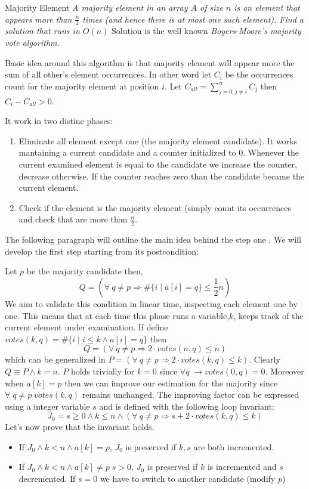 \begin{problem}{Majority Element}
\textit{A majority element in an array $A$ of size $n$ is an element that appears more than $\frac{n}{2}$ times (and hence there is at most one such element). Find a solution that runs in $O(n)$}
Solution is the well known \textit{Boyers-Moore's majority vote algorithm}.
\begin{solution}
Basic idea around this algorithm is that majority element will appear more the sum of all other's element occurrences. In other word let $C_i$ be the  occurrences count 
for the majority element at position $i$. Let $C_{all} = \sum_{j=0,j\neq i}^n C_j$ then $ C_i - C_{all} > 0$.

It work in two distinc phases:
\begin{enumerate}
\item Eliminate all element except one (the majority element candidate). It works mantaining a current candidate and a counter initialized to $0$. Whenever the current examined element is equal to the candidate we increase the counter, decrease otherwise. If the counter reaches zero than the candidate became the current element. 
\item Check if the element is the majority element (simply count its occurrences and check that are more than $\frac{n}{2}$.

\end{enumerate}

The following paragraph will outline the main idea behind the step one \cite{pap:hesselink}.
We will develop the first step starting from its postcondition:

Let $p$ be the majority candidate then,
\[
Q = (\forall \: q \neq p \Rightarrow \#\{i \; | \; a[i] = q \}\leq \frac{1}{2}n)
\]
We aim to validate this condition in linear time, inspecting each element one by one. This means that at each time this phase runs a variable,$k$, keeps track of the current  element under examination. 
If define $ votes(k,q) = \#\{i \; | \; i \leq k  \wedge a[i] = q \} $ then 
\[
Q = (\forall \: q \neq p \Rightarrow 2\cdot votes(n,q) \leq n)
\]
which can be generalized in $P = (\forall \: q \neq p \Rightarrow 2\cdot votes(k,q) \leq k)$. Clearly $Q \equiv P \wedge k=n$.
$P$ holds trivially for $k=0$ since $\forall q \; \rightarrow votes(0,q)=0$. Moreover when $ a[k] =p $ then we can improve our estimation for the majority since $\forall \; q\neq p \; votes(k,q)$ remains unchanged.
The improving factor  can be expressed using a integer variable $s$ and is defined with the following loop invariant:
\[
J_0 = s \geq 0 \wedge k\leq n \wedge (\forall \: q \neq p \Rightarrow s+2\cdot votes(k,q) \leq k)
\]
Let's now prove that the invariant holds.
\begin{itemize}
	\item If $J_0 \wedge k < n \wedge a[k]=p$, $J_0$ is preserved if $k,s$ are both incremented.
	\item If $J_0 \wedge k < n \wedge a[k] \neq p \; s > 0$, $J_0$ is preserved if $k$ is incremented and $s$ decremented. If $s=0$ we have to switch to another candidate (modify $p$)
\end{itemize}


\end{solution}
\end{problem}
